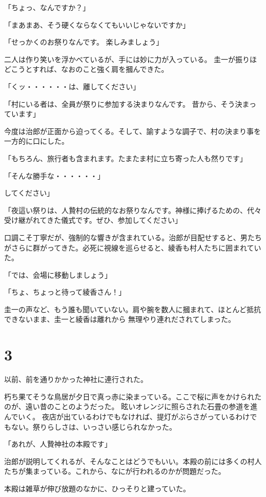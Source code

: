 ﻿\documentclass[book,tate]{jlreq}
\begin{document}
「ちょっ、なんですか？」

「まあまあ、そう硬くならなくてもいいじゃないですか」

「せっかくのお祭りなんです。 楽しみましょう」

二人は作り笑いを浮かべているが、手には妙に力が入っている。 圭一が振りほどこうとすれば、なおのこと強く肩を摑んできた。

「くッ・・・・・・は、離してください」

「村にいる者は、全員が祭りに参加する決まりなんです。 昔から、そう決まっています」

今度は治郎が正面から迫ってくる。そして、諭すような調子で、村の決まり事を一方的に口にした。

「もちろん、旅行者も含まれます。たまたま村に立ち寄った人も然りです」

「そんな勝手な・・・・・・」

してください」

「夜這い祭りは、人贄村の伝統的なお祭りなんです。神様に捧げるための、代々受け継がれてきた儀式です。ぜひ、参加してください」

口調こそ丁寧だが、強制的な響きが含まれている。治郎が目配せすると、男たちがさらに群がってきた。必死に視線を巡らせると、綾香も村人たちに囲まれていた。

「では、会場に移動しましょう」

「ちょ、ちょっと待って綾香さん！」

圭一の声など、もう誰も聞いていない。肩や腕を数人に摑まれて、ほとんど抵抗できないまま、圭一と綾香は離れから 無理やり連れだされてしまった。

\section*{3}

以前、前を通りかかった神社に連行された。

朽ち果てそうな鳥居が夕日で真っ赤に染まっている。ここで桜に声をかけられたのが、遠い昔のことのようだった。 眩いオレンジに照らされた石畳の参道を進んでいく。 夜店が出ているわけでもなければ、提灯がぶらさがっているわけでもない。祭りらしさは、いっさい感じられなかった。

「あれが、人贄神社の本殿です」

治郎が説明してくれるが、そんなことはどうでもいい。本殿の前には多くの村人たちが集まっている。これから、なにが行われるのかが問題だった。

本殿は雑草が伸び放題のなかに、ひっそりと建っていた。
\end{document}
